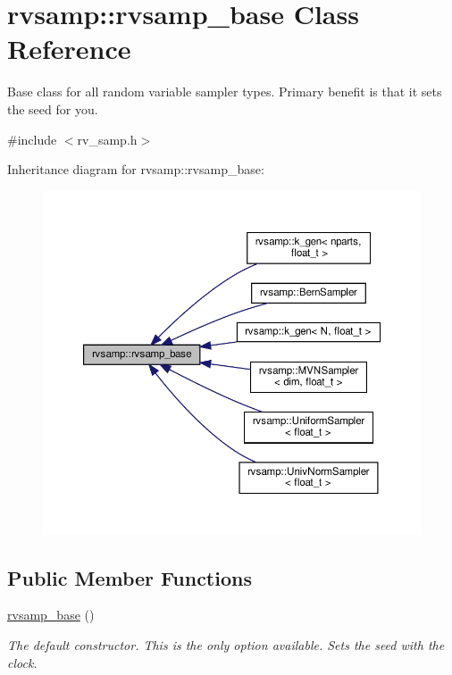 \hypertarget{classrvsamp_1_1rvsamp__base}{}\section{rvsamp\+:\+:rvsamp\+\_\+base Class Reference}
\label{classrvsamp_1_1rvsamp__base}


Base class for all random variable sampler types. Primary benefit is that it sets the seed for you.  




{\ttfamily \#include $<$rv\+\_\+samp.\+h$>$}



Inheritance diagram for rvsamp\+:\+:rvsamp\+\_\+base\+:
\nopagebreak
\begin{figure}[H]
\begin{center}
\leavevmode
\includegraphics[width=350pt]{classrvsamp_1_1rvsamp__base__inherit__graph}
\end{center}
\end{figure}
\subsection*{Public Member Functions}
\begin{DoxyCompactItemize}
\item 
\mbox{\label{classrvsamp_1_1rvsamp__base_ab20e90775a57b9a142520f236b39e7c1}} 
\hyperlink{classrvsamp_1_1rvsamp__base_ab20e90775a57b9a142520f236b39e7c1}{rvsamp\+\_\+base} ()
\begin{DoxyCompactList}\small\item\em The default constructor. This is the only option available. Sets the seed with the clock. \end{DoxyCompactList}\end{DoxyCompactItemize}
